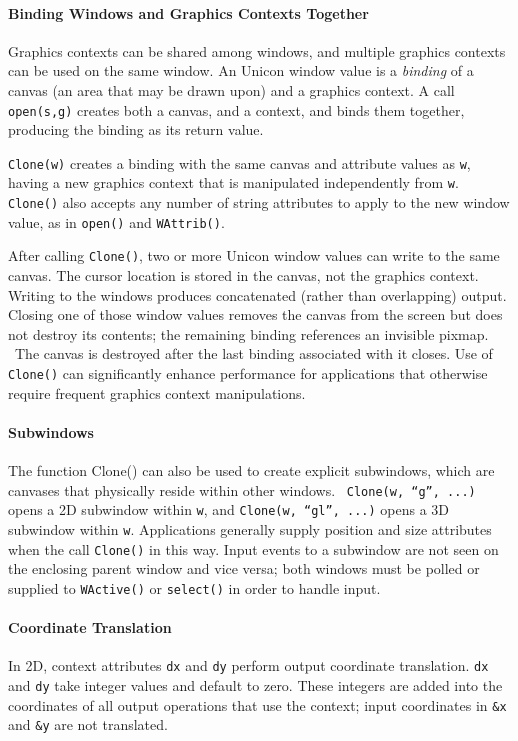 \paragraph{Binding Windows and Graphics Contexts Together}
Graphics contexts can be shared among windows, and multiple graphics
contexts can be used on the same window. An Unicon window value is a
\textit{binding} of a canvas (an area that may be drawn upon) and a
graphics context. A call
\texttt{open(s,{\textquotedbl}g{\textquotedbl})} creates both a canvas,
and a context, and binds them together, producing the binding as its
return value.

\texttt{Clone(w)} creates a binding with the same canvas and attribute
values as \texttt{w}, having a new graphics context that is manipulated
independently from \texttt{w}. \texttt{Clone()} also accepts any number
of string attributes to apply to the new window value, as in
\texttt{open()} and \texttt{WAttrib()}.

After calling \texttt{Clone()}, two or more Unicon window values can
write to the same canvas. The cursor location is stored in the
canvas, not the graphics context. Writing to the windows produces
concatenated (rather than overlapping) output. Closing one of those
window values removes the canvas from the screen but does not destroy
its contents; the remaining binding references an invisible pixmap.
\ The canvas is destroyed after the last binding associated with it
closes. Use of \texttt{Clone()} can significantly enhance performance
for applications that otherwise require frequent graphics context
manipulations.

\paragraph{Subwindows}
The function Clone() can also be used to create explicit subwindows,
which are canvases that physically reside within other windows.
\ \texttt{Clone(w, {\textquotedblleft}g{\textquotedblright}, ...)}
opens a 2D subwindow within \texttt{w}, and \texttt{Clone(w,
{\textquotedblleft}gl{\textquotedblright}, ...)} opens a 3D subwindow
within \texttt{w}. Applications generally supply position and size
attributes when the call \texttt{Clone()} in this way. Input events
to a subwindow are not seen on the enclosing parent window and vice
versa; both windows must be polled or supplied to \texttt{WActive()} or
\texttt{select()} in order to handle input.

\paragraph{Coordinate Translation}
In 2D, context attributes \texttt{dx} and \texttt{dy} perform output
coordinate translation. \texttt{dx} and \texttt{dy} take integer values
and default to zero. These integers are added into the coordinates of
all output operations that use the context; input coordinates in
\texttt{\&x} and \texttt{\&y} are not translated.

